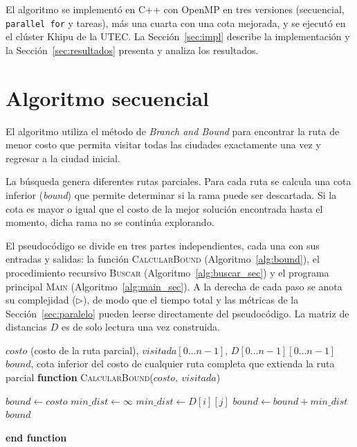 \documentclass[12pt,a4paper]{article}
\makeatletter
\newcommand{\FUNCTION}[2]{\STATE \textbf{function} \textsc{#1}(#2)\begin{ALC@g}}
\newcommand{\ENDFUNCTION}{\end{ALC@g}\STATE \textbf{end function}}
\makeatother
\begin{document}
El algoritmo se implementó en C++ con OpenMP en tres versiones (secuencial, \texttt{parallel for} y tareas), más una cuarta con una cota mejorada, y se ejecutó en el clúster Khipu de la UTEC. La Sección~\ref{sec:impl} describe la implementación y la Sección~\ref{sec:resultados} presenta y analiza los resultados.

\section{Algoritmo secuencial}

El algoritmo utiliza el método de \textit{Branch and Bound} para encontrar la ruta de menor costo que permita visitar todas las ciudades exactamente una vez y regresar a la ciudad inicial.

La búsqueda genera diferentes rutas parciales. Para cada ruta se calcula una cota inferior (\textit{bound}) que permite determinar si la rama puede ser descartada. Si la cota es mayor o igual que el costo de la mejor solución encontrada hasta el momento, dicha rama no se continúa explorando.

El pseudocódigo se divide en tres partes independientes, cada una con sus entradas y salidas: la función \textsc{CalcularBound} (Algoritmo~\ref{alg:bound}), el procedimiento recursivo \textsc{Buscar} (Algoritmo~\ref{alg:buscar_sec}) y el programa principal \textsc{Main} (Algoritmo~\ref{alg:main_sec}). A la derecha de cada paso se anota su complejidad ($\triangleright$), de modo que el tiempo total y las métricas de la Sección~\ref{sec:paralelo} pueden leerse directamente del pseudocódigo. La matriz de distancias $D$ es de solo lectura una vez construida.

\begin{algorithm}[H]
\caption{\textsc{CalcularBound}: cota inferior de una ruta parcial}
\label{alg:bound}
\begin{algorithmic}[1]
    \REQUIRE $costo$ (costo de la ruta parcial), $visitada[0\dots n-1]$, $D[0\dots n-1][0\dots n-1]$
    \ENSURE $bound$, cota inferior del costo de cualquier ruta completa que extienda la ruta parcial
    \FUNCTION{CalcularBound}{$costo,\ visitada$}
        \STATE $bound \gets costo$ 
                \STATE $min\_dist \gets \infty$ 
                        \STATE $min\_dist \gets D[i][j]$
                    \ENDIF
                \ENDFOR
                \STATE $bound \gets bound + min\_dist$ 
            \ENDIF
        \ENDFOR
        \RETURN $bound$
    \ENDFUNCTION
\end{algorithmic}
\end{algorithm}
\end{document}
